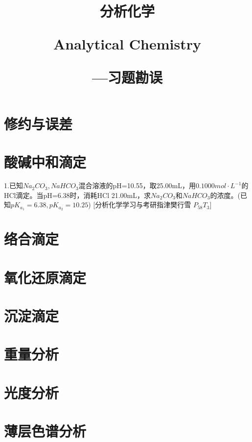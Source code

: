 \documentclass[a3paper]{book}
\title{\centering \dy \hwzs 分析化学
	
	\hspace*{\fill}
	
	 \hwxw \xiaochu  Analytical Chemistry
	

	\dy \quad\quad\quad —\dsi 习题勘误
	
	\hspace*{\fill}
}
\date{}
\author{}
\newcommand{\erhao}{\fontsize{22.1pt}{\baselineskip}\selectfont}
\newcommand{\xiaosi}{\fontsize{12.1pt}{\baselineskip}\selectfont}
\newcommand {\hwxw} {\CJKfamily{hwxw}}
\begin{document}
	\maketitle
	
	\pagestyle{empty}
	\tableofcontents
	
\newpage
	\pagestyle{fancy}
	\chapter{\erhao 修约与误差}



\newpage
	\pagestyle{fancy}
	\chapter{\erhao 酸碱中和滴定}

\xiaosi \heiti 1.已知$Na_{2}CO_{3},NaHCO_{3}$混合溶液的pH=10.55，取25.00mL，用$0.1000mol·L^{-1}$的HCl滴定。当pH=6.38时，消耗HCl 21.00mL，求$Na_{2}CO_{3}\mbox{和}NaHCO_{3}$的浓度。(已知$pK_{a_{1}}=6.38,pK_{a_{2}}=10.25$)
\hfill [\hwxw 分析化学学习与考研指津\quad 樊行雪 \quad $P_{58}$\quad $T_{3}$]



\newpage
	\pagestyle{fancy}
	\chapter{\erhao 络合滴定}
	
\newpage
	\pagestyle{fancy}
	\chapter{\erhao 氧化还原滴定}
	
	
\newpage
	\pagestyle{fancy}
	\chapter{\erhao 沉淀滴定}
		
\newpage
	\pagestyle{fancy}
	\chapter{\erhao 重量分析}
	
\newpage
	\pagestyle{fancy}
	\chapter{\erhao 光度分析}
	
\newpage
	\pagestyle{fancy}
	\chapter{\erhao 薄层色谱分析}
\end{document}
